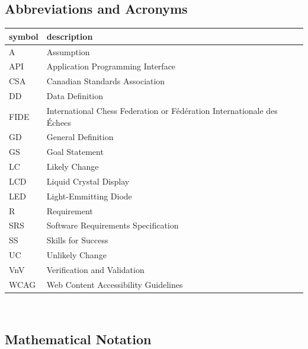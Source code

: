 \documentclass[12pt]{article}
\begin{document}
\subsection{Abbreviations and Acronyms}
\begin{tabular}{l l} 
  \toprule		
  \textbf{symbol} & \textbf{description}\\
  \midrule 
  A & Assumption\\
  API & Application Programming Interface\\
  CSA & Canadian Standards Association\\
  DD & Data Definition\\
  FIDE & International Chess Federation or Fédération Internationale des Échecs\\
  GD & General Definition\\
  GS & Goal Statement\\
  LC & Likely Change\\
  LCD & Liquid Crystal Display\\
  LED & Light-Emmitting Diode\\
  R & Requirement\\
  SRS & Software Requirements Specification\\
  SS & Skills for Success\\
  UC & Unlikely Change\\
  VnV & Verification and Validation\\
  WCAG & Web Content Accessibility Guidelines\\
  \bottomrule
\end{tabular}\\

\subsection{Mathematical Notation}
\end{document}
